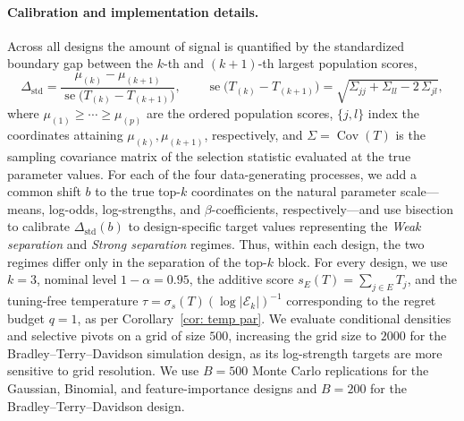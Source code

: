 \documentclass[12pt]{article}
\newcommand{\Ek}{\mathcal{E}_{k}}      %
\newcommand{\snoise}{\sigma_{s}}
\begin{document}
\begin{appendices}
\paragraph{Calibration and implementation details. }
Across all designs the amount of signal is quantified by the standardized boundary gap between the $k$-th and $(k{+}1)$-th largest population scores,
\[
  \Delta_{\mathrm{std}}
  =\frac{\mu_{(k)}-\mu_{(k+1)}}{\operatorname{se}\bigl(T_{(k)}-T_{(k+1)}\bigr)},
  \qquad
  \operatorname{se}\bigl(T_{(k)}-T_{(k+1)}\bigr)=\sqrt{\Sigma_{jj}+\Sigma_{ll}-2\,\Sigma_{jl}},
\]
where $\mu_{(1)}\ge\cdots\ge\mu_{(p)}$ are the ordered population scores, $\{j,l\}$ index the coordinates attaining $\mu_{(k)},\mu_{(k+1)}$, respectively, and $\Sigma=\operatorname{Cov}(T)$ is the sampling covariance matrix of the selection statistic evaluated at the true parameter values.
For each of the four data-generating processes, we add a common shift $b$ to the true top-$k$ coordinates on the natural parameter scale---means, log-odds, log-strengths, and $\beta$-coefficients, respectively---and use bisection to calibrate $\Delta_{\mathrm{std}}(b)$ to design-specific target values representing the \emph{Weak separation} and \emph{Strong separation} regimes. Thus, within each design, the two regimes differ only in the separation of the top-$k$ block.
For every design, we use $k=3$, nominal level $1-\alpha=0.95$, the additive score $s_E(T)=\sum_{j\in E}T_j$, and the tuning-free temperature $\tau=\snoise(T)(\log|\Ek|)^{-1}$ corresponding to the regret budget $q=1$, as per Corollary~\ref{cor: temp par}. We evaluate conditional densities and selective pivots on a grid of size $500$, increasing the grid size to $2000$ for the Bradley--Terry--Davidson simulation design, as its log-strength targets are more sensitive to grid resolution. We use $B=500$ Monte Carlo replications for the Gaussian, Binomial, and feature-importance designs and $B=200$ for the Bradley--Terry--Davidson design.


\end{appendices}
\end{document}
